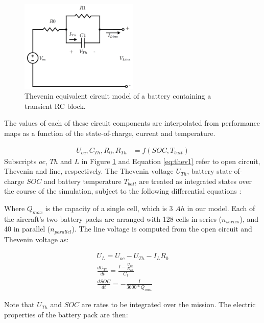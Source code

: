 \documentclass[]{aiaa-tc}%
\begin{document}
\begin{figure}[!htb]%
	\centering
	\includegraphics[width=0.5\textwidth]{figures/circuitv2.png}
	\caption{Thevenin equivalent circuit model of a battery containing a transient RC block.}
	\label{fig:thevenin}
\end{figure}

The values of each of these circuit components are interpolated from performance maps as a function of the state-of-charge, current and temperature.

\begin{align}
U_{oc},C_{Th},R_0,R_{Th} &= f(SOC, T_{batt}) \label{eq:thev1}
\end{align}
%
Subscripts $oc$, $Th$ and $L$ in Figure \ref{fig:thevenin} and Equation \ref{eq:thev1} refer to open circuit, Thevenin and line, respectively. The Thevenin voltage $U_{Th}$, battery state-of-charge $SOC$ and battery temperature $T_{batt}$ are treated as integrated states over the course of the simulation, subject to the following differential equations \cite{Hongwen}:



Where $Q_{max}$ is the capacity of a single cell, which is 3 $Ah$ in our model.  Each of the aircraft's two battery packs are arranged with 128 cells in series ($n_{series}$), and 40 in parallel ($n_{parallel}$).  The line voltage is computed from the open circuit and Thevenin voltage as:

\begin{align}
U_L = U_{oc} - U_{Th} - I_L R_0 \label{eq:U_L} \\
\frac{d U_{Th}}{d t} = \frac{I-\frac{U_{Th}}{R_{Th}}}{C_1}\\
\frac{d SOC}{d t} = -\frac{I}{3600*Q_{max}}
\end{align}

Note that $U_{Th}$ and $SOC$ are rates to be integrated over the mission. The electric properties of the battery pack are then:
\end{document}
